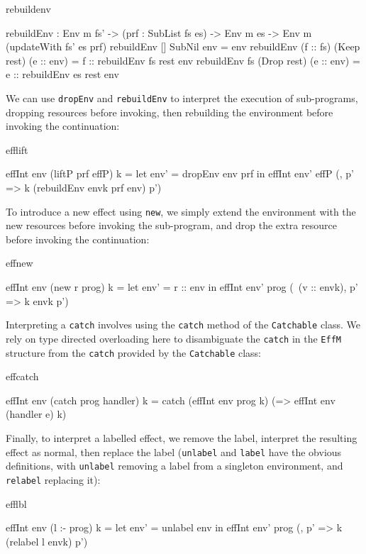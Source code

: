 \begin{SaveVerbatim}{rebuildenv}

rebuildEnv : Env m fs' -> (prf : SubList fs es) -> 
             Env m es -> Env m (updateWith fs' es prf) 
rebuildEnv []        SubNil      env = env
rebuildEnv (f :: fs) (Keep rest) (e :: env) 
      = f :: rebuildEnv fs rest env
rebuildEnv fs        (Drop rest) (e :: env) 
      = e :: rebuildEnv es rest env

\end{SaveVerbatim}

\noindent
We can use \texttt{dropEnv} and \texttt{rebuildEnv} to interpret the execution
of sub-programs, dropping resources before invoking, then rebuilding the
environment before invoking the continuation:

\begin{SaveVerbatim}{efflift}

effInt env (liftP prf effP) k 
  = let env' = dropEnv env prf in 
        effInt env' effP (\envk, p' => 
              k (rebuildEnv envk prf env) p')

\end{SaveVerbatim}

\noindent
To introduce a new effect using \texttt{new}, we simply extend the environment
with the new resources before invoking the sub-program, and drop the extra
resource before invoking the continuation:

\begin{SaveVerbatim}{effnew}

effInt env (new r prog) k 
     = let env' = r :: env in 
           effInt env' prog 
               (\ (v :: envk), p' => k envk p')

\end{SaveVerbatim}

\noindent
Interpreting a \texttt{catch} involves using the \texttt{catch} method of
the \texttt{Catchable} class. We rely on type directed overloading here to
disambiguate the \texttt{catch} in the \texttt{EffM} structure from the
\texttt{catch} provided by the \texttt{Catchable} class:

\begin{SaveVerbatim}{effcatch}

effInt env (catch prog handler) k 
     = catch (effInt env prog k)
             (\e => effInt env (handler e) k)

\end{SaveVerbatim}

\noindent
Finally, to interpret a labelled effect, we remove the label, interpret the
resulting effect as normal, then replace the label (\texttt{unlabel} and
\texttt{label} have the obvious definitions, with \texttt{unlabel} removing
a label from a singleton environment, and \texttt{relabel} replacing it):

\begin{SaveVerbatim}{efflbl}

effInt env (l :- prog) k 
   = let env' = unlabel env in
         effInt env' prog (\envk, p' => 
                              k (relabel l envk) p')
\end{SaveVerbatim}

